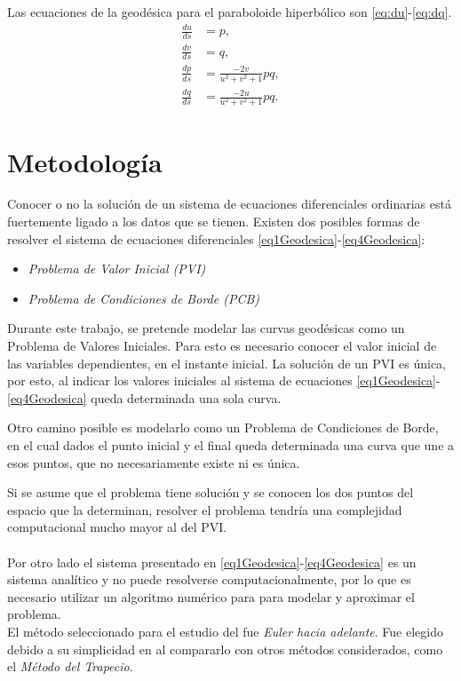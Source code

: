\documentclass{endm}
\begin{document}
Las ecuaciones de la geod\'esica para el paraboloide hiperb\'olico son \ref{eq:du}-\ref{eq:dq}.
{\small
\begin{align}
\frac{du}{ds}&=p,\label{eq:du} \\
\frac{dv}{ds}&=q,\label{eq:dv}     \\
\frac{dp}{ds}&=\frac{-2v}{u^2+v^2+1} pq, \label{eq:dp}\\ 
\frac{dq}{ds}&=\frac{-2u}{u^2+v^2+1} pq. \label{eq:dq}
\end{align}
}

%
\section{Metodolog\'ia}\label{Metodo}

\tab Conocer o no la soluci\'on de un sistema de ecuaciones diferenciales ordinarias est\'a fuertemente ligado a los datos que se tienen.
Existen dos posibles formas de resolver el sistema de ecuaciones diferenciales \ref{eq1Geodesica}-\ref{eq4Geodesica}:
\begin{itemize}
    \item \textit{Problema de Valor Inicial (PVI)}
    \item \textit{Problema de Condiciones de Borde (PCB)}
\end{itemize}
 
Durante este trabajo, se pretende modelar las curvas geod\'esicas como un Problema de Valores Iniciales. Para esto es necesario conocer el valor inicial de las variables dependientes, en el instante inicial. La soluci\'on de un PVI es \'unica, por esto, al indicar los valores iniciales al sistema de ecuaciones \ref{eq1Geodesica}-\ref{eq4Geodesica} queda determinada una sola curva.

Otro camino posible es modelarlo como un Problema de Condiciones de Borde, en el cual dados el punto inicial y el final queda determinada una curva que une a esos puntos, que no necesariamente existe ni es \'unica.

Si se asume que el problema tiene soluci\'on y se conocen los dos puntos del espacio que la determinan, resolver el problema tendr\'ia una complejidad computacional mucho mayor al del PVI.\\
\\
Por otro lado el sistema presentado en \ref{eq1Geodesica}-\ref{eq4Geodesica} es un sistema anal\'itico y no puede resolverse computacionalmente, por lo que es necesario utilizar un algoritmo num\'erico para para modelar y aproximar el problema. 
\\
El m\'etodo seleccionado para el estudio del fue \textit{ Euler hacia adelante}. Fue elegido debido a su simplicidad en al compararlo con otros m\'etodos considerados, como el \textit{M\'etodo del Trapecio}.
\end{document}
